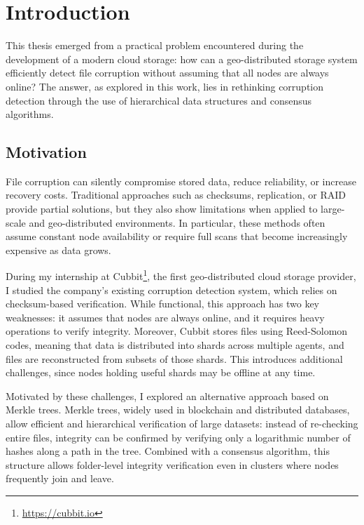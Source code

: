 \chapter{Introduction}

This thesis emerged from a practical problem encountered during the development of a modern cloud storage: how can a geo-distributed storage system efficiently detect file corruption without assuming that all nodes are always online? The answer, as explored in this work, lies in rethinking corruption detection through the use of hierarchical data structures and consensus algorithms.

\section{Motivation}

File corruption can silently compromise stored data, reduce reliability, or increase recovery costs. Traditional approaches such as checksums, replication, or RAID \cite{chen1994raid} provide partial solutions, but they also show limitations when applied to large-scale and geo-distributed environments. In particular, these methods often assume constant node availability or require full scans that become increasingly expensive as data grows.

During my internship at Cubbit\footnote{\url{https://cubbit.io}}, the first geo-distributed cloud storage provider, I studied the company's existing corruption detection system, which relies on checksum-based verification. While functional, this approach has two key weaknesses: it assumes that nodes are always online, and it requires heavy operations to verify integrity. Moreover, Cubbit stores files using Reed-Solomon codes, meaning that data is distributed into shards across multiple agents, and files are reconstructed from subsets of those shards. This introduces additional challenges, since nodes holding useful shards may be offline at any time.

Motivated by these challenges, I explored an alternative approach based on Merkle trees. Merkle trees, widely used in blockchain and distributed databases, allow efficient and hierarchical verification of large datasets: instead of re-checking entire files, integrity can be confirmed by verifying only a logarithmic number of hashes along a path in the tree. Combined with a consensus algorithm, this structure allows folder-level integrity verification even in clusters where nodes frequently join and leave.

